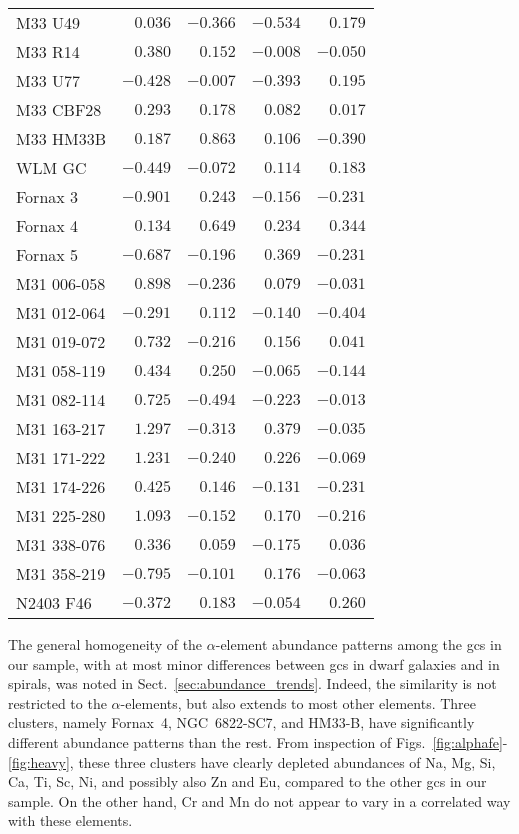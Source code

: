 \documentclass{aa}
\begin{document}
\begin{table}
\begin{tabular}{l r r r r}
M33 U49         & $ 0.036$ & $-0.366$ & $-0.534$ & $ 0.179$  \\
M33 R14         & $ 0.380$ & $ 0.152$ & $-0.008$ & $-0.050$  \\
M33 U77         & $-0.428$ & $-0.007$ & $-0.393$ & $ 0.195$  \\
M33 CBF28       & $ 0.293$ & $ 0.178$ & $ 0.082$ & $ 0.017$  \\
M33 HM33B       & $ 0.187$ & $ 0.863$ & $ 0.106$ & $-0.390$  \\
WLM GC          & $-0.449$ & $-0.072$ & $ 0.114$ & $ 0.183$  \\
Fornax 3        & $-0.901$ & $ 0.243$ & $-0.156$ & $-0.231$  \\
Fornax 4        & $ 0.134$ & $ 0.649$ & $ 0.234$ & $ 0.344$  \\
Fornax 5        & $-0.687$ & $-0.196$ & $ 0.369$ & $-0.231$  \\
M31 006-058     & $ 0.898$ & $-0.236$ & $ 0.079$ & $-0.031$  \\
M31 012-064     & $-0.291$ & $ 0.112$ & $-0.140$ & $-0.404$  \\
M31 019-072     & $ 0.732$ & $-0.216$ & $ 0.156$ & $ 0.041$  \\
M31 058-119     & $ 0.434$ & $ 0.250$ & $-0.065$ & $-0.144$  \\
M31 082-114     & $ 0.725$ & $-0.494$ & $-0.223$ & $-0.013$  \\
M31 163-217     & $ 1.297$ & $-0.313$ & $ 0.379$ & $-0.035$  \\
M31 171-222     & $ 1.231$ & $-0.240$ & $ 0.226$ & $-0.069$  \\
M31 174-226     & $ 0.425$ & $ 0.146$ & $-0.131$ & $-0.231$  \\
M31 225-280     & $ 1.093$ & $-0.152$ & $ 0.170$ & $-0.216$  \\
M31 338-076     & $ 0.336$ & $ 0.059$ & $-0.175$ & $ 0.036$  \\
M31 358-219     & $-0.795$ & $-0.101$ & $ 0.176$ & $-0.063$  \\
N2403 F46       & $-0.372$ & $ 0.183$ & $-0.054$ & $ 0.260$  \\
\hline
\end{tabular}
\end{table}

The general homogeneity of the $\alpha$-element abundance patterns among the \acp{gc} in our sample, with at most minor differences between \acp{gc} in dwarf galaxies and in spirals, was noted in Sect.~\ref{sec:abundance_trends}. Indeed, the similarity is not restricted to the $\alpha$-elements, but also extends to most other elements. 
Three clusters, namely Fornax~4, NGC~6822-SC7, and HM33-B, have significantly different abundance patterns than the rest. From inspection of Figs.~\ref{fig:alphafe}-\ref{fig:heavy}, these three clusters have clearly depleted abundances of Na, Mg, Si, Ca, Ti, Sc, Ni, and possibly also Zn and Eu, compared to the other \acp{gc} in our sample. On the other hand, Cr and Mn do not appear to vary in a correlated way with these elements.
\end{document}
